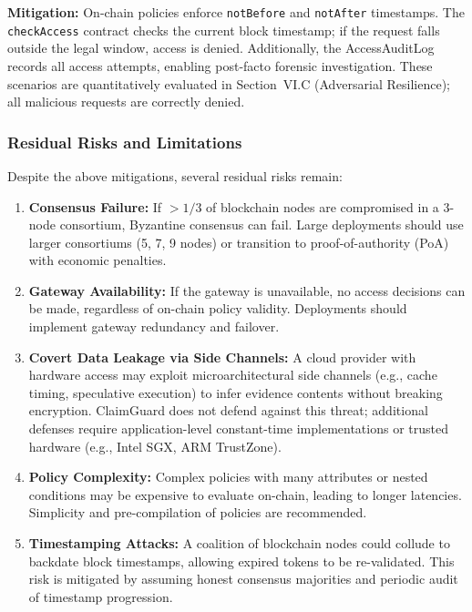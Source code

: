 \documentclass[final,5p,times,twocolumn]{elsarticle}
\begin{document}
\textbf{Mitigation:} On-chain policies enforce \texttt{notBefore} and \texttt{notAfter} timestamps. The \texttt{checkAccess} contract checks the current block timestamp; if the request falls outside the legal window, access is denied. Additionally, the AccessAuditLog records all access attempts, enabling post-facto forensic investigation.
These scenarios are quantitatively evaluated in Section~VI.C (Adversarial Resilience); all malicious requests are correctly denied.

\subsubsection{Residual Risks and Limitations}

Despite the above mitigations, several residual risks remain:

\begin{enumerate}
	\item \textbf{Consensus Failure:} If $> 1/3$ of blockchain nodes are compromised in a 3-node consortium, Byzantine consensus can fail. Large deployments should use larger consortiums (5, 7, 9 nodes) or transition to proof-of-authority (PoA) with economic penalties.

	\item \textbf{Gateway Availability:} If the gateway is unavailable, no access decisions can be made, regardless of on-chain policy validity. Deployments should implement gateway redundancy and failover.

	\item \textbf{Covert Data Leakage via Side Channels:} A cloud provider with hardware access may exploit microarchitectural side channels (e.g., cache timing, speculative execution) to infer evidence contents without breaking encryption. ClaimGuard does not defend against this threat; additional defenses require application-level constant-time implementations or trusted hardware (e.g., Intel SGX, ARM TrustZone).

	\item \textbf{Policy Complexity:} Complex policies with many attributes or nested conditions may be expensive to evaluate on-chain, leading to longer latencies. Simplicity and pre-compilation of policies are recommended.

	\item \textbf{Timestamping Attacks:} A coalition of blockchain nodes could collude to backdate block timestamps, allowing expired tokens to be re-validated. This risk is mitigated by assuming honest consensus majorities and periodic audit of timestamp progression.
\end{enumerate}
\end{document}
